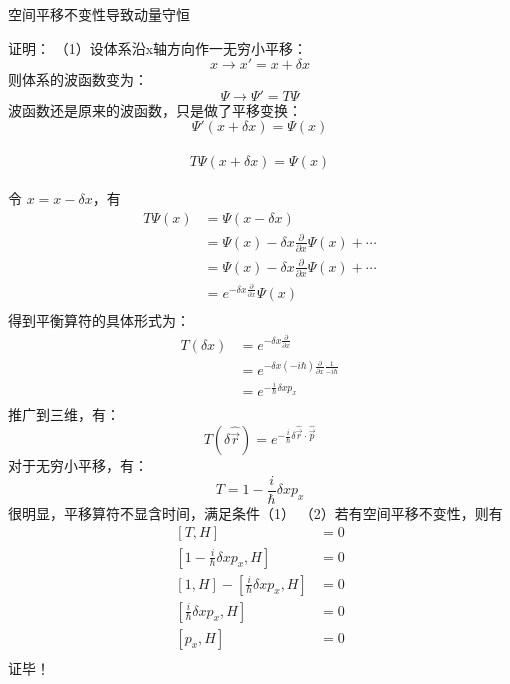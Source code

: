 \begin{frame} [allowframebreaks=]
    \frametitle{} 
    \begin{tcolorbox}[colback=yellow!5,colframe=yellow!75!black,title=动量守恒：]
        空间平移不变性导致动量守恒                                
    \end{tcolorbox}
    \alert{证明：} （1）设体系沿x轴方向作一无穷小平移：
    $$ x \to x'=x+\delta x $$
    则体系的波函数变为：
    $$ \Psi \to \Psi'=T\Psi  $$
    波函数还是原来的波函数，只是做了平移变换： $$ \Psi'(x+\delta x) = \Psi(x) $$\\
    $$ T\Psi(x+\delta x) = \Psi(x) $$\\
    令 $x=x-\delta x$，有
    $$\begin{aligned}
        T\Psi(x)&= \Psi(x-\delta x) \\
        &= \Psi(x)-\delta x \frac{\partial}{\partial x}\Psi(x)+\cdots\\
        &= \Psi(x)-\delta x \frac{\partial}{\partial x}\Psi(x)+\cdots\\
        &= e^{-\delta x \frac{\partial}{\partial x}} \Psi(x)\\
    \end{aligned}$$
    得到平衡算符的具体形式为：
    $$\begin{aligned}
        T(\delta x)&= e^{-\delta x \frac{\partial}{\partial x}} \\
        &= e^{-\delta x (-i\hbar) \frac{\partial}{\partial x}\frac{1}{-i\hbar}} \\
        &= e^{-\frac{i}{\hbar}\delta x p_x } \\
    \end{aligned}$$
    推广到三维，有：
    $$ T(\delta \hat{\vec{r}})= e^{-\frac{i}{\hbar}\delta \hat{\vec{r}}\cdot \hat{\vec{p}} }  $$ 
    对于无穷小平移，有：
    $$T=1-\frac{i}{\hbar}\delta x p_x$$
    很明显，平移算符不显含时间，满足条件（1）
    （2）若有空间平移不变性，则有
    $$\begin{aligned}
        [T,H]&= 0 \\
        [1-\frac{i}{\hbar}\delta x p_x, H] &=0 \\
        [1, H]-[\frac{i}{\hbar}\delta x p_x, H]&=0 \\
        [\frac{i}{\hbar}\delta x p_x, H]&=0 \\
        [p_x, H] &=0 \\
    \end{aligned}$$
    证毕！
\end{frame}

